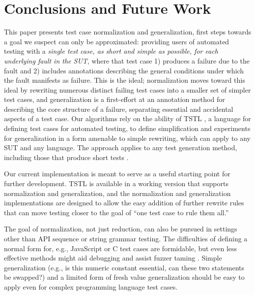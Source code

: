 \section{Conclusions and Future Work}

This paper presents test case normalization and generalization, first
steps towards a goal we suspect can only be approximated: providing
users of automated testing with a \emph{single test case, as short and
  simple as possible, for each underlying fault in the SUT}, where
that test case 1) produces a failure due to the fault and 2) includes
annotations describing the general conditions under which the fault
manifests as failure.  This is the ideal; normalization moves toward
this ideal by rewriting numerous distinct failing test cases into a
smaller set of simpler test cases, and generalization is a
first-effort at an annotation method for describing the core structure
of a failure, separating essential and accidental aspects of a test
case.  Our algorithms rely on the ability of TSTL \cite{NFM15,ISSTA15}, a language for
defining test cases for automated testing, to define simplification
and experiments for generalization in a form amenable to simple
rewriting, which can apply to any SUT and any language.  The approach applies to any test generation
method, including those that produce short tests \cite{FA11,SoftBET}.

Our current implementation is meant to serve as a useful starting
point for further development.  TSTL is available in a working version
\cite{tstl} that supports normalization and generalization, and the
normalization and generalization implementations are designed to allow
the easy addition of further rewrite rules that can move testing closer to
the goal of ``one test case to rule them all.''

The goal of normalization, not just
reduction, can also be pursued in settings other than API sequence or
string grammar testing.  The difficulties of defining a normal form
for, e.g., JavaScript \cite{jsfunfuzz} or C \cite{CReduce} test cases
are formidable, but even less effective methods might aid debugging and assist fuzzer taming
\cite{PLDI13}.  Simple generalization (e.g., is this numeric constant
essential, can these two statements be swapped?) and a limited form of
fresh value generalization should be easy to apply
even for complex programming language test cases.
